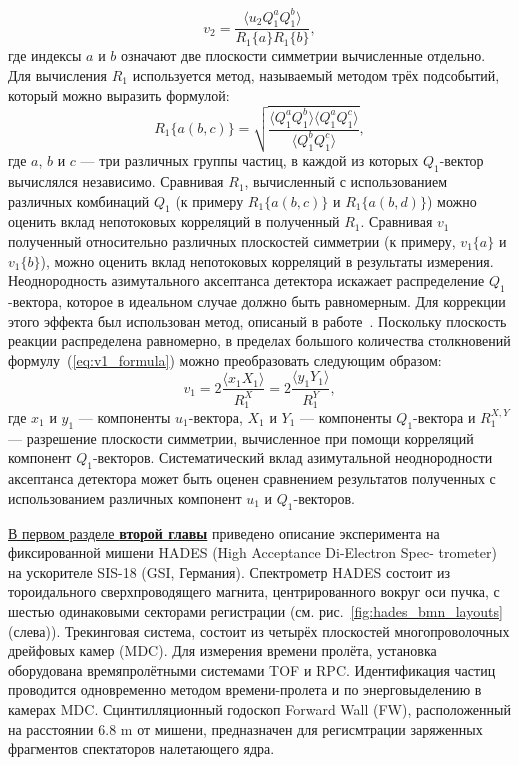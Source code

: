 \begin{equation}
    v_2 = \frac{\langle u_2 Q_1^a Q_1^b \rangle}{R_1\{a\} R_1\{b\}},
    \label{eq:v2_formula}
\end{equation}
%
где индексы $a$ и $b$ означают две плоскости симметрии вычисленные отдельно.
Для вычисления $R_1$  используется метод, называемый методом трёх подсобытий, который можно выразить формулой:
%
\begin{equation}
    R_1\{a(b,c)\}  =  \sqrt { \frac{ \langle Q_1^a Q_1^b \rangle \langle Q_1^a Q_1^c \rangle }{ \langle Q_1^b Q_1^c \rangle} },
\end{equation}
%
где $a$, $b$ и $c$ --- три различных группы частиц, в каждой из которых $Q_1$-вектор вычислялся независимо.
Сравнивая $R_1$, вычисленный с использованием различных комбинаций $Q_1$ (к примеру $R_1\{a(b,c)\}$ и $R_1\{a(b,d)\}$) можно оценить вклад непотоковых корреляций в полученный $R_1$.
Сравнивая $v_1$ полученный относительно различных плоскостей симметрии (к примеру, $v_1\{a\}$ и $v_1\{b\}$), можно оценить вклад непотоковых
корреляций в результаты измерения. \\
Неоднородность азимутального аксептанса детектора  искажает распределение $Q_1$-вектора, которое в идеальном случае должно быть равномерным. 
Для коррекции этого эффекта был использован метод, описаный в работе~\cite{Selyuzhenkov:2007zi}.
Поскольку плоскость реакции распределена равномерно, в пределах большого количества столкновений формулу~(\ref{eq:v1_formula}) можно преобразовать следующим образом:
%
\begin{equation}
    v_1 =  2\frac{ \langle x_1 X_1 \rangle }{R_1^X} = 2\frac{ \langle y_1 Y_1 \rangle }{R_1^Y},
    \label{eq:v1xy_formula}
\end{equation}
%
где $x_1$ и $y_1$ --- компоненты $u_1$-вектора, $X_1$ и $Y_1$ --- компоненты $Q_1$-вектора и $R_1^{X,Y}$ --- разрешение плоскости симметрии, вычисленное при
помощи корреляций компонент $Q_1$-векторов.
Систематический вклад азимутальной неоднородности аксептанса детектора может быть оценен сравнением результатов полученных с использованием различных компонент $u_1$ и $Q_1$-векторов. 



\underline{В первом разделе \textbf{второй главы}}  приведено описание эксперимента на фиксированной мишени  HADES (High Acceptance Di-Electron Spec-
trometer)  ~\cite{HADES:2009aat}  на ускорителе SIS-18 (GSI, Германия). Спектрометр HADES состоит из тороидального сверхпроводящего магнита,
центрированного вокруг оси пучка, с шестью одинаковыми секторами регистрации (см. рис.~\ref{fig:hades_bmn_layouts} (слева)).
Трекинговая система, состоит из четырёх плоскостей многопроволочных дрейфовых камер (MDC).
Для измерения времени пролёта, установка оборудована времяпролётными системами TOF и RPC.
Идентификация частиц проводится одновременно  методом времени-пролета и по энерговыделению в камерах MDC.
Сцинтилляционный годоскоп Forward Wall (FW), расположенный на расстоянии 6.8 m от мишени, предназначен для 
регисмтрации заряженных фрагментов спектаторов налетающего ядра.


